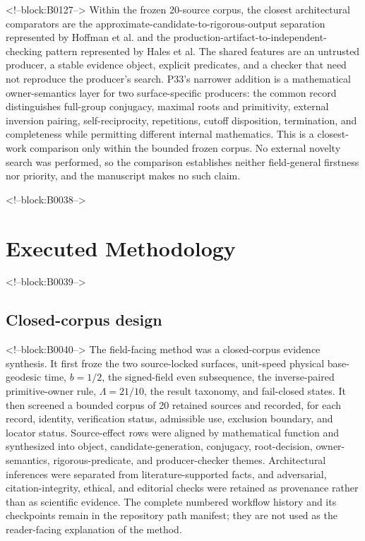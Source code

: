 \documentclass[11pt,a4paper]{article}
\begin{document}
<!--block:B0127-->
Within the frozen 20-source corpus, the closest architectural comparators are the approximate-candidate-to-rigorous-output separation represented by Hoffman et al. and the production-artifact-to-independent-checking pattern represented by Hales et al. The shared features are an untrusted producer, a stable evidence object, explicit predicates, and a checker that need not reproduce the producer's search. P33's narrower addition is a mathematical owner-semantics layer for two surface-specific producers: the common record distinguishes full-group conjugacy, maximal roots and primitivity, external inversion pairing, self-reciprocity, repetitions, cutoff disposition, termination, and completeness while permitting different internal mathematics. This is a closest-work comparison only within the bounded frozen corpus. No external novelty search was performed, so the comparison establishes neither field-general firstness nor priority, and the manuscript makes no such claim.

<!--block:B0038-->
\hypertarget{executed-methodology}{%
\section{Executed Methodology}\label{executed-methodology}}

<!--block:B0039-->
\hypertarget{closed-corpus-design}{%
\subsection{Closed-corpus design}\label{closed-corpus-design}}

<!--block:B0040-->
The field-facing method was a closed-corpus evidence synthesis. It first froze the two source-locked surfaces, unit-speed physical base-geodesic time, \(b=1/2\), the signed-field even subsequence, the inverse-paired primitive-owner rule, \(\Lambda=21/10\), the result taxonomy, and fail-closed states. It then screened a bounded corpus of 20 retained sources and recorded, for each record, identity, verification status, admissible use, exclusion boundary, and locator status. Source-effect rows were aligned by mathematical function and synthesized into object, candidate-generation, conjugacy, root-decision, owner-semantics, rigorous-predicate, and producer-checker themes. Architectural inferences were separated from literature-supported facts, and adversarial, citation-integrity, ethical, and editorial checks were retained as provenance rather than as scientific evidence. The complete numbered workflow history and its checkpoints remain in the repository path manifest; they are not used as the reader-facing explanation of the method.
\end{document}
